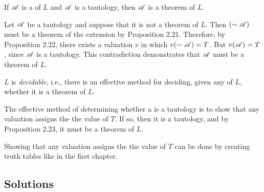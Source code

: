 \begin{proposition}
  If \(\mathscr{A}\) is a \wf{} of \(L\) and \(\mathscr{A}\) is a tautology, then \(\mathscr{A}\) is a theorem of \(L\).

  \prf{} Let \(\mathscr{A}\) be a tautology and suppose that it is not a theorem of \(L\). Then \((\sim\mathscr{A})\) must be a theorem of the extension \Lext{} by Proposition 2.21. Therefore, by Proposition 2.22, there exists a valuation \(v\) in which \(v(\sim\mathscr{A}) = T\). But \(v(\mathscr{A}) = T\), since \(\mathscr{A}\) is a tautology. This contradiction demonstrates that \(\mathscr{A}\) must be a theorem of \(L\).
\end{proposition}

\begin{proposition}
  \(L\) is \textit{decidable}, i.e., there is an effective method for deciding, given any \wf{} of \(L\), whether it is a theorem of \(L\).

  \prf{} The effective method of determining whether a \wf{} is a tautology is to show that any valuation assigns the \wf{} the value of \(T\). If so, then it is a tautology, and by Proposition 2.23, it must be a theorem of \(L\).

  \note{} Showing that any valuation assigns the \wf{} the value of \(T\) can be done by creating truth tables like in the first chapter.
\end{proposition}

\subsection*{Solutions}

